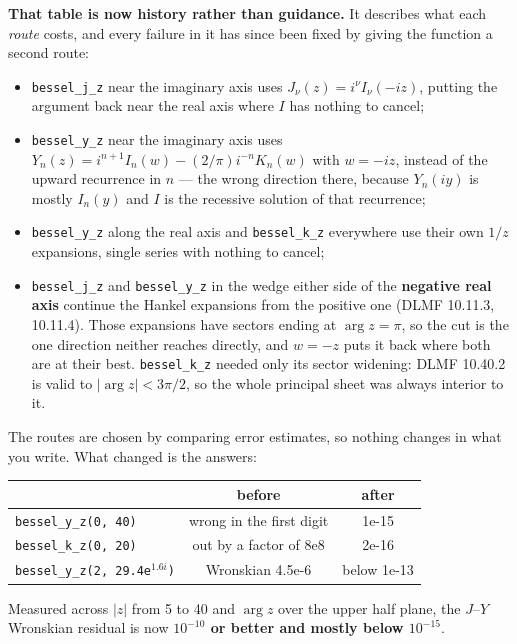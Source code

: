 \documentclass[11pt]{article}
\newcommand{\code}[1]{\texttt{#1}}
\begin{document}
\textbf{That table is now history rather than guidance.} It describes
what each \emph{route} costs, and every failure in it has since been
fixed by giving the function a second route:
\begin{itemize}
\item \code{bessel\_j\_z} near the imaginary axis uses
  $J_\nu(z) = i^\nu I_\nu(-iz)$, putting the argument back near the real
  axis where $I$ has nothing to cancel;
\item \code{bessel\_y\_z} near the imaginary axis uses
  $Y_n(z) = i^{n+1}I_n(w) - (2/\pi)i^{-n}K_n(w)$ with $w = -iz$, instead
  of the upward recurrence in $n$ --- the wrong direction there, because
  $Y_n(iy)$ is mostly $I_n(y)$ and $I$ is the recessive solution of that
  recurrence;
\item \code{bessel\_y\_z} along the real axis and \code{bessel\_k\_z}
  everywhere use their own $1/z$ expansions, single series with nothing
  to cancel;
\item \code{bessel\_j\_z} and \code{bessel\_y\_z} in the wedge either
  side of the \textbf{negative real axis} continue the Hankel expansions
  from the positive one (DLMF 10.11.3, 10.11.4). Those expansions have
  sectors ending at $\arg z = \pi$, so the cut is the one direction
  neither reaches directly, and $w = -z$ puts it back where both are at
  their best. \code{bessel\_k\_z} needed only its sector widening: DLMF
  10.40.2 is valid to $|\arg z| < 3\pi/2$, so the whole principal sheet
  was always interior to it.
\end{itemize}
The routes are chosen by comparing error estimates, so nothing changes
in what you write. What changed is the answers:

\begin{center}
\begin{tabular}{lcc}
 & \textbf{before} & \textbf{after}\\
\hline
\code{bessel\_y\_z(0, 40)} & wrong in the first digit & 1e-15\\
\code{bessel\_k\_z(0, 20)} & out by a factor of 8e8 & 2e-16\\
\code{bessel\_y\_z(2, 29.4e$^{1.6i}$)} & Wronskian 4.5e-6 & below 1e-13\\
\end{tabular}
\end{center}

Measured across $|z|$ from 5 to 40 and $\arg z$ over the upper half
plane, the $J$--$Y$ Wronskian residual is now \textbf{$10^{-10}$ or
better and mostly below $10^{-15}$}.
\end{document}
